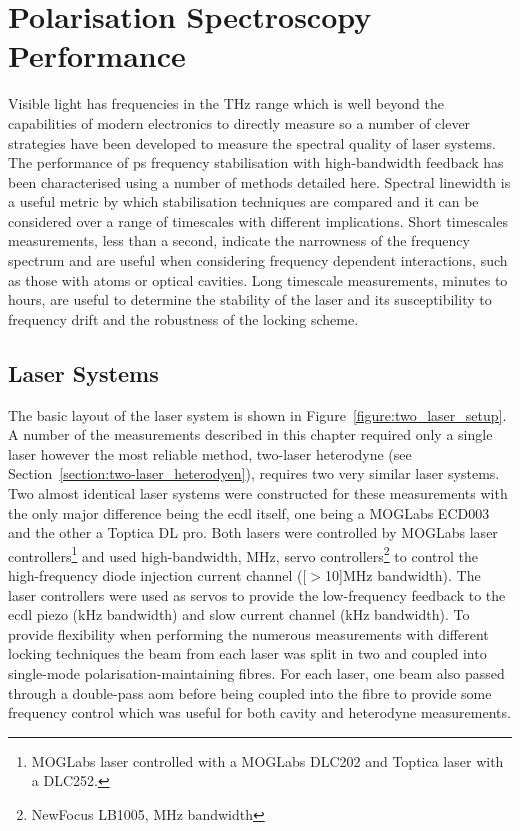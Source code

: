 \section{Polarisation Spectroscopy Performance}
Visible light has frequencies in the THz range which is well beyond the capabilities of modern electronics to directly measure so a number of clever strategies have been developed to measure the spectral quality of laser systems.
The performance of \gls{ps} frequency stabilisation with high-bandwidth feedback has been characterised using a number of methods detailed here.
Spectral linewidth is a useful metric by which stabilisation techniques are compared and it can be considered over a range of timescales with different implications.
Short timescales measurements, less than a second, indicate the narrowness of the frequency spectrum and are useful when considering frequency dependent interactions, such as those with atoms or optical cavities.
Long timescale measurements, minutes to hours, are useful to determine the stability of the laser and its susceptibility to frequency drift and the robustness of the locking scheme.

\subsection{Laser Systems}\label{section:ps_experimental_setup}

The basic layout of the laser system is shown in Figure~\ref{figure:two_laser_setup}.
A number of the measurements described in this chapter required only a single laser however the most reliable method, two-laser heterodyne (see Section~\ref{section:two-laser_heterodyen}), requires two very similar laser systems.
Two almost identical laser systems were constructed for these measurements with the only major difference being the \gls{ecdl} itself, one being a MOGLabs ECD003 and the other a Toptica DL pro.
Both lasers were controlled by MOGLabs laser controllers\footnote{MOGLabs laser controlled with a MOGLabs DLC202 and Toptica laser with a DLC252.} and used high-bandwidth, \unit[14]{MHz}, servo controllers\footnote{NewFocus LB1005, \unit[14]{MHz} bandwidth} to control the high-frequency diode injection current channel (\unit[$>$10]{MHz} bandwidth).
The laser controllers were used as servos to provide the low-frequency feedback to the \gls{ecdl} piezo (\unit[1]{kHz} bandwidth) and slow current channel (\unit[50]{kHz} bandwidth).
To provide flexibility when performing the numerous measurements with different locking techniques the beam from each laser was split in two and coupled into single-mode polarisation-maintaining fibres.
For each laser, one beam also passed through a double-pass \gls{aom} before being coupled into the fibre to provide some frequency control which was useful for both cavity and heterodyne measurements.

